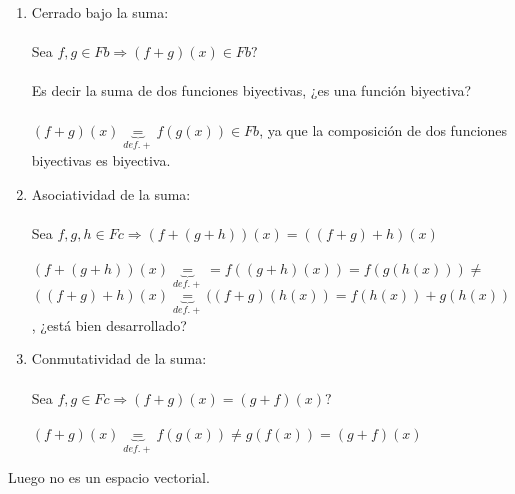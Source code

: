 \documentclass{article}
\begin{document}
\begin{enumerate}[1.]
\begin{enumerate}[(1)]
\item
	Cerrado bajo la suma: \\ \\
	Sea $f,g \in Fb \Rightarrow (f+g)(x) \in Fb?$ \\ \\
	Es decir la suma de dos funciones biyectivas, ¿es una función biyectiva? \\ \\
	$(f+g)(x) \underbrace{=}_{def.+} f(g(x))  \in Fb$, ya que la composición de dos funciones biyectivas es biyectiva.

\item
	Asociatividad de la suma: \\ \\
	Sea $f,g,h \in Fc \Rightarrow (f+(g+h))(x) = ((f+g)+h)(x)$ \\ \\
	$(f+(g+h))(x) \underbrace{=}_{def.+}  = f((g+h)(x)) = f( g(h(x))) \not = $\\
	$((f+g)+h)(x) \underbrace{=}_{def.+} ((f+g)(h(x)) = f(h(x)) + g(h(x))$,
	¿está bien desarrollado?
\item
	Conmutatividad de la suma: \\ \\
	Sea $f,g \in Fc \Rightarrow (f+g)(x) = (g+f)(x) ?$ \\ \\
	$(f+g)(x) \underbrace{=}_{def.+} f(g(x)) \not = g(f(x)) = (g+f)(x)$ \\
\end{enumerate}
Luego no es un espacio vectorial.


\end{enumerate}
\end{document}
